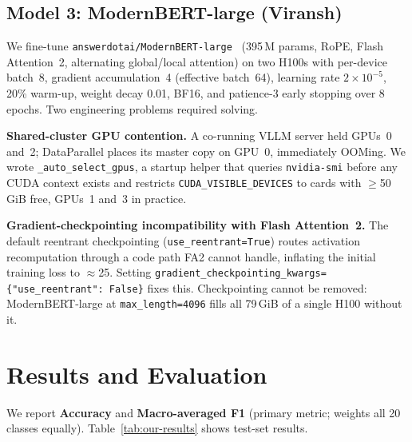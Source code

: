 \documentclass[11pt]{article}
\begin{document}
\subsection{Model 3: ModernBERT-large (Viransh)}

We fine-tune \texttt{answerdotai/ModernBERT-large}~\citep{Warner2024ModernBERT}
(395\,M params, RoPE, Flash Attention~2, alternating global/local
attention) on two H100s with per-device batch~8, gradient accumulation~4
(effective batch~64), learning rate $2\times10^{-5}$, 20\% warm-up,
weight decay 0.01, BF16, and patience-3 early stopping over 8 epochs.
Two engineering problems required solving.

\textbf{Shared-cluster GPU contention.}  A co-running VLLM server held
GPUs~0 and~2; DataParallel places its master copy on GPU~0, immediately
OOMing.  We wrote \texttt{\_auto\_select\_gpus}, a startup helper that
queries \texttt{nvidia-smi} before any CUDA context exists and
restricts \texttt{CUDA\_VISIBLE\_DEVICES} to cards with $\geq$50\,GiB
free, GPUs~1 and~3 in practice.

\textbf{Gradient-checkpointing incompatibility with Flash Attention~2.}
The default reentrant checkpointing (\texttt{use\_reentrant=True}) routes
activation recomputation through a code path FA2 cannot handle, inflating
the initial training loss to $\approx$25.  Setting
\texttt{gradient\_checkpointing\_kwargs=\{"use\_reentrant": False\}} fixes
this.  Checkpointing cannot be removed: ModernBERT-large at
\texttt{max\_length=4096} fills all 79\,GiB of a single H100 without it.

\section{Results and Evaluation}

We report \textbf{Accuracy} and \textbf{Macro-averaged F1} (primary
metric; weights all 20 classes equally).  Table~\ref{tab:our-results}
shows test-set results.
\end{document}
